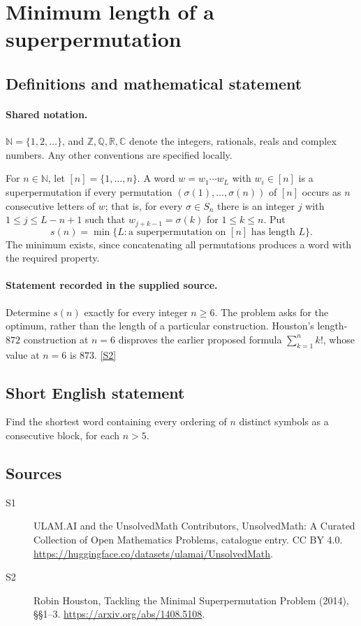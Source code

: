 \documentclass[11pt]{article}
\newcommand{\sref}[2]{\hyperlink{source:#1:#2}{[S#2]}}
\begin{document}
\section{Minimum length of a superpermutation}\label{statement}

\subsection{Definitions and mathematical statement}

\paragraph{Shared notation.}$\mathbb N=\{1,2,\ldots\}$, and $\mathbb Z,\mathbb Q,\mathbb R,\mathbb C$ denote the integers, rationals, reals and complex numbers. Any other conventions are specified locally.


For $n\in\mathbb N$, let $[n]=\{1,\ldots,n\}$. A word $w=w_1\cdots w_L$ with $w_i\in[n]$ is a superpermutation if every permutation $(\sigma(1),\ldots,\sigma(n))$ of $[n]$ occurs as $n$ consecutive letters of $w$; that is, for every $\sigma\in S_n$ there is an integer $j$ with $1\le j\le L-n+1$ such that $w_{j+k-1}=\sigma(k)$ for $1\le k\le n$. Put
\[
s(n)=\min\{L:\text{a superpermutation on }[n]\text{ has length }L\}.
\]
The minimum exists, since concatenating all permutations produces a word with the required property.
\paragraph{Statement recorded in the supplied source.}
Determine $s(n)$ exactly for every integer $n\ge6$. The problem asks for the optimum, rather than the length of a particular construction. Houston's length-$872$ construction at $n=6$ disproves the earlier proposed formula $\sum_{k=1}^{n}k!$, whose value at $n=6$ is $873$. \sref{statement}{2}
\subsection{Short English statement}
Find the shortest word containing every ordering of $n$ distinct symbols as a consecutive block, for each $n>5$.
\subsection{Sources}
\begin{description}
\item[\hypertarget{source:statement:1}{S1}] ULAM.AI and the UnsolvedMath Contributors, UnsolvedMath: A Curated Collection of Open Mathematics Problems, catalogue entry. CC BY 4.0. \url{https://huggingface.co/datasets/ulamai/UnsolvedMath}.
\item[\hypertarget{source:statement:2}{S2}] Robin Houston, Tackling the Minimal Superpermutation Problem (2014), §§1–3. \url{https://arxiv.org/abs/1408.5108}.
\end{description}
\label{end:statement}
\end{document}
